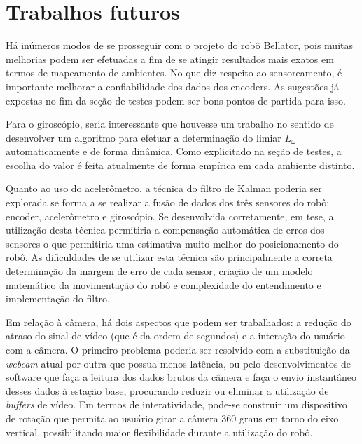 \chapter{Trabalhos futuros}
Há inúmeros modos de se prosseguir com o projeto do robô Bellator, pois muitas melhorias podem ser efetuadas a fim de se atingir resultados mais exatos em termos de mapeamento de ambientes.
No que diz respeito ao sensoreamento, é importante melhorar a confiabilidade dos dados dos encoders. As sugestões já expostas no fim da seção de testes podem ser bons pontos de partida para isso.

Para o giroscópio, seria interessante que houvesse um trabalho no sentido de desenvolver um algoritmo para efetuar a determinação do limiar $L_\omega$ automaticamente e de forma dinâmica. Como explicitado na seção de testes, a escolha do valor é feita atualmente de forma empírica em cada ambiente distinto.

Quanto ao uso do acelerômetro, a técnica do filtro de Kalman poderia ser explorada se forma a se realizar a fusão de dados dos três sensores do robô: encoder, acelerômetro e giroscópio. Se desenvolvida corretamente, em tese, a utilização desta técnica permitiria a compensação automática de erros dos sensores o que permitiria uma estimativa muito melhor do posicionamento do robô. As dificuldades de se utilizar esta técnica são principalmente a correta determinação da margem de erro de cada sensor, criação de um modelo matemático da movimentação do robô e complexidade do entendimento e implementação do filtro.

Em relação à câmera, há dois aspectos que podem ser trabalhados: a redução do atraso do sinal de vídeo (que é da ordem de segundos) e a interação do usuário com a câmera. O primeiro problema poderia ser resolvido com a substituição da \textit{webcam} atual por outra que possua menos latência, ou pelo desenvolvimentos de software que faça a leitura dos dados brutos da câmera e faça o envio instantâneo desses dados à estação base, procurando reduzir ou eliminar a utilização de \textit{buffers} de vídeo. Em termos de interatividade, pode-se construir um dispositivo de rotação que permita ao usuário girar a câmera 360 graus em torno do eixo vertical, possibilitando maior flexibilidade durante a utilização do robô.
